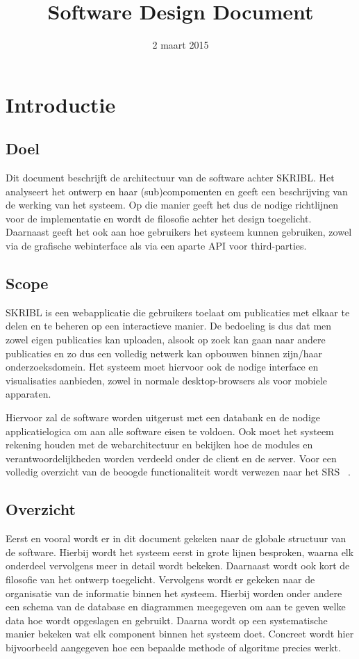 \documentclass{article}
\title{Software Design Document}
\author{} %
\date{2 maart 2015} %
\begin{document}




\tableofcontents
\newpage

\section{Introductie}

\subsection{Doel}

Dit document beschrijft de architectuur van de software achter SKRIBL. 
Het analyseert het ontwerp en haar (sub)compomenten en geeft een beschrijving
van de werking van het systeem. Op die manier geeft het dus de nodige richtlijnen
voor de implementatie en wordt de filosofie achter het design toegelicht.
Daarnaast geeft het ook aan hoe gebruikers het systeem kunnen gebruiken, zowel
via de grafische webinterface als via een aparte API voor third-parties.

\subsection{Scope}

SKRIBL is een webapplicatie die gebruikers toelaat om publicaties met elkaar te delen
en te beheren op een interactieve manier. De bedoeling is dus dat men zowel eigen publicaties kan uploaden, alsook op zoek kan gaan naar andere publicaties en zo dus een volledig netwerk kan opbouwen binnen zijn/haar onderzoeksdomein. Het systeem moet hiervoor ook de nodige interface en visualisaties aanbieden, zowel in normale desktop-browsers als voor mobiele apparaten.

Hiervoor zal de software worden uitgerust met een databank en de nodige applicatielogica om aan alle software eisen te voldoen. Ook moet het systeem rekening houden met de webarchitectuur en bekijken hoe de modules en verantwoordelijkheden worden verdeeld onder de client en de server. Voor een volledig overzicht van de beoogde functionaliteit wordt verwezen naar het SRS ~\cite{Xtreport:SRS}.

\subsection{Overzicht}

Eerst en vooral wordt er in dit document gekeken naar de globale structuur van de software. Hierbij wordt het systeem eerst in grote lijnen besproken, waarna elk onderdeel vervolgens meer in detail wordt bekeken. Daarnaast wordt ook kort de filosofie van het ontwerp toegelicht. 
Vervolgens wordt er gekeken naar de organisatie van de informatie binnen het systeem. Hierbij worden onder andere een schema van de database en diagrammen meegegeven om aan te geven welke data hoe wordt opgeslagen en gebruikt. 
Daarna wordt op een systematische manier bekeken wat elk component binnen het systeem doet. Concreet wordt hier bijvoorbeeld aangegeven hoe een bepaalde methode of algoritme precies werkt.
\end{document}
